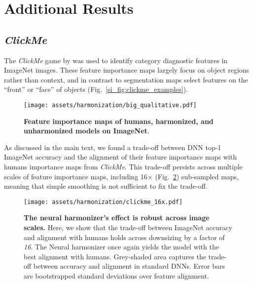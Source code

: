 \section{Additional Results}
\subsection{\textit{ClickMe}}
The \textit{ClickMe} game by \cite{Linsley2019-ew} was used to identify category diagnostic features in ImageNet images. These feature importance maps largely focus on object regions rather than context, and in contrast to segmentation maps select features on the ``front'' or ``face'' of objects (Fig.~\ref{si_fig:clickme_examples}).

\begin{figure}[h!]
\begin{center}
   \texttt{[image: assets/harmonization/big\_qualitative.pdf]}
\end{center}
   \caption{\textbf{Feature importance maps of humans, harmonized, and unharmonized models on ImageNet}.}
 \label{fig:qualitative_figure_big}
\end{figure}

As discussed in the main text, we found a trade-off between DNN top-1 ImageNet accuracy and the alignment of their feature importance maps with humans importance maps from \textit{ClickMe}. This trade-off persists across multiple scales of feature importance maps, including 16$\times$ (Fig.~\ref{si_fig:clickme_results_16}) sub-sampled maps, meaning that simple smoothing is not sufficient to fix the trade-off.

\begin{figure}[h!]
\begin{center}
   \texttt{[image: assets/harmonization/clickme\_16x.pdf]}
\end{center}
   \caption{\textbf{The neural harmonizer's effect is robust across image scales.} Here, we show that the trade-off between ImageNet accuracy and alignment with humans holds across downsizing by a factor of \textit{16}. The Neural harmonizer once again yields the model with the best alignment with humans. Grey-shaded area captures the trade-off between accuracy and alignment in standard DNNs. Error bars are bootstrapped standard deviations over feature alignment.}
\label{si_fig:clickme_results_16}
\end{figure}

